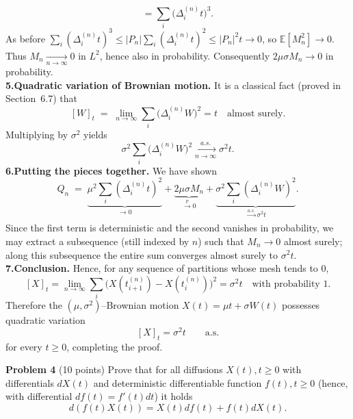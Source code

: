 \documentclass{article}
\begin{document}
{$$               =\sum_{i}\bigl(\Delta_i^{(n)}t\bigr)^{3}.
$$
As before $\sum_{i}(\Delta_i^{(n)}t)^{3}\le|P_n|\sum_{i}(\Delta_i^{(n)}t)^{2}\le|P_n|^{2}t\to0$,
so $\mathbb E[M_n^{2}]\to0$.
Thus $M_n\xrightarrow[n\to\infty]{}0$ in $L^{2}$, hence also in probability.  Consequently
$2\mu\sigma M_n\to0$ in probability. \\
\medskip
\textbf{5.\;Quadratic variation of Brownian motion.}
It is a classical fact (proved in Section~6.7) that
$$
[W]_t\;=\;\lim_{n\to\infty}\sum_{i}\bigl(\Delta_i^{(n)}W\bigr)^2=t
\quad\text{almost surely}.
$$
Multiplying by $\sigma^{2}$ yields
$$
\sigma^{2}\sum_{i}\bigl(\Delta_i^{(n)}W\bigr)^2\xrightarrow[n\to\infty]{a.s.}\sigma^{2}t.
$$
\medskip
\textbf{6.\;Putting the pieces together.}
We have shown
$$
Q_n
\;=\;\underbrace{\mu^{2}\sum_{i}(\Delta_i^{(n)}t)^{2}}_{\longrightarrow0}
   +\underbrace{2\mu\sigma M_n}_{\xrightarrow[]{\mathbb P}0}
   +\underbrace{\sigma^{2}\sum_{i}(\Delta_i^{(n)}W)^{2}}_{\xrightarrow[]{a.s.}\sigma^{2}t}.
$$
Since the first term is deterministic and the second vanishes in probability, we may extract a subsequence (still indexed by $n$) such that $M_n\to0$ almost surely; along this subsequence the entire sum converges almost surely to $\sigma^{2}t$. \\
\medskip
\textbf{7.\;Conclusion.}
Hence, for any sequence of partitions whose mesh tends to $0$,
$$
[X]_t=\lim_{n\to\infty}\sum_{i}\bigl(X(t_{i+1}^{(n)})-X(t_i^{(n)})\bigr)^{2}
      =\sigma^{2}t \quad\text{with probability }1.
$$
Therefore the $(\mu,\sigma^{2})$–Brownian motion $X(t)=\mu t+\sigma W(t)$ possesses quadratic variation
$$
\boxed{[X]_t=\sigma^{2}t\qquad\text{a.s.}}
$$
for every $t\ge0$, completing the proof.
}


\textbf{Problem 4}   (10 points) Prove that for all diffusions $X(t), t \geq 0$ with differentials $dX(t)$ and deterministic differentiable function $f(t), t \geq 0$ (hence, with differential $df(t) = f'(t)dt$) it holds
$$d(f(t)X(t)) = X(t)df(t) + f(t)dX(t).$$
\end{document}
